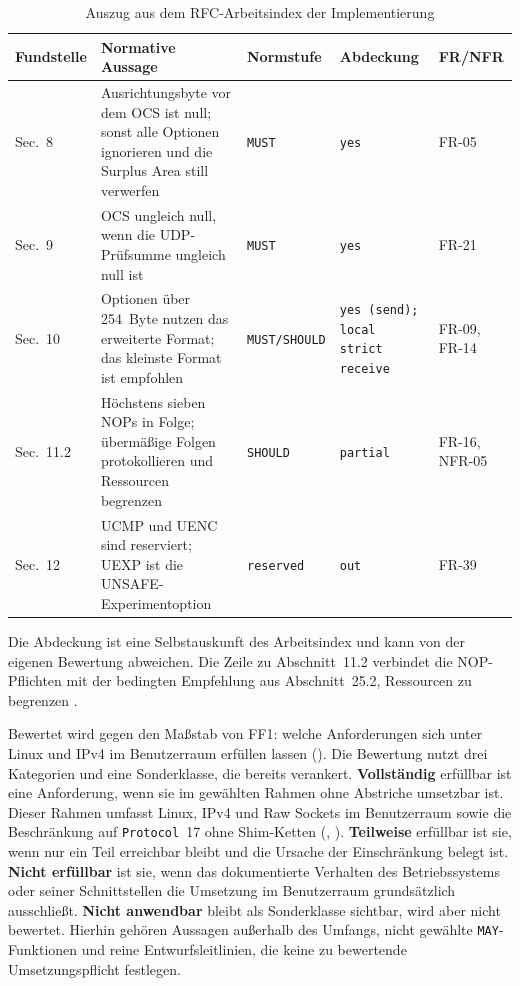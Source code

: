 \begin{table}[H]
  \centering
  \caption{Auszug aus dem RFC-Arbeitsindex der Implementierung}
  \label{tab:anforderungsmatrix}
  \footnotesize
  \setlength{\tabcolsep}{4pt}
  \renewcommand{\arraystretch}{1.0}
  \begin{tabularx}{\textwidth}{@{}L{1.3cm}YL{2.25cm}L{2.1cm}L{1.9cm}@{}}
    \toprule
    \textbf{Fund\-stelle} & \textbf{Normative Aussage} & \textbf{Norm\-stufe} & \textbf{Abdeckung} &
      \textbf{FR/NFR} \\
    \midrule
    Sec.~8 & Ausrichtungsbyte vor dem OCS ist null; sonst alle Optionen ignorieren und die Surplus Area
      still verwerfen & \texttt{MUST} & \texttt{yes} & FR-05 \\
    Sec.~9 & OCS ungleich null, wenn die UDP-Prüfsumme ungleich null ist & \texttt{MUST} & \texttt{yes} &
      FR-21 \\
    Sec.~10 & Optionen über 254~Byte nutzen das erweiterte Format; das kleinste Format ist empfohlen &
      \texttt{MUST/}\allowbreak\texttt{SHOULD} & \texttt{yes (send); local strict receive} & FR-09, FR-14 \\
    Sec.~11.2 & Höchstens sieben NOPs in Folge; übermäßige Folgen protokollieren und Ressourcen begrenzen &
      \texttt{SHOULD} & \texttt{partial} & FR-16, NFR-05 \\
    Sec.~12 & UCMP und UENC sind reserviert; UEXP ist die UNSAFE-Experimentoption & \texttt{reserved} &
      \texttt{out} & FR-39 \\
    \bottomrule
  \end{tabularx}
\end{table}

Die Abdeckung ist eine Selbstauskunft des Arbeitsindex und kann von der eigenen Bewertung abweichen.
Die Zeile zu Abschnitt~11.2 verbindet die NOP-Pflichten mit der bedingten Empfehlung aus Abschnitt~25.2,
Ressourcen zu begrenzen \cite[Sec.~25.2]{rfc9868}.

Bewertet wird gegen den Maßstab von FF1: welche Anforderungen sich unter Linux und IPv4 im Benutzerraum
 erfüllen lassen (). Die Bewertung nutzt
drei Kategorien und eine Sonderklasse, die  bereits verankert.
\textbf{Vollständig} erfüllbar ist eine Anforderung, wenn sie im gewählten Rahmen ohne Abstriche umsetzbar
ist. Dieser Rahmen umfasst Linux, IPv4 und Raw Sockets im Benutzerraum sowie die Beschränkung auf
\texttt{Protocol}~17 ohne Shim-Ketten (, ).
\textbf{Teilweise} erfüllbar ist sie, wenn nur ein Teil erreichbar bleibt und die Ursache der
Einschränkung belegt ist. \textbf{Nicht erfüllbar} ist sie, wenn das dokumentierte Verhalten des
Betriebssystems oder seiner Schnittstellen die Umsetzung im Benutzerraum grundsätzlich ausschließt.
\textbf{Nicht anwendbar}
bleibt als Sonderklasse sichtbar, wird aber nicht bewertet. Hierhin gehören Aussagen außerhalb des
Umfangs, nicht gewählte \texttt{MAY}-Funktionen und reine Entwurfsleitlinien, die keine zu bewertende
Umsetzungspflicht festlegen.

